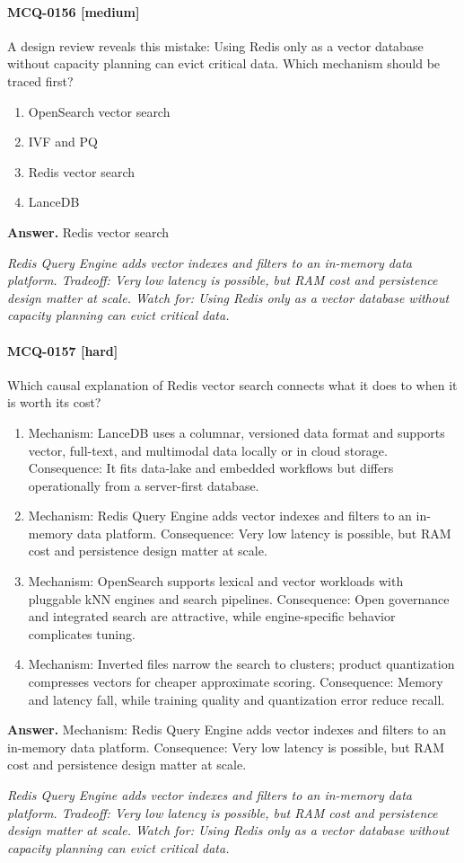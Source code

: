 \paragraph{MCQ-0156 [medium]} A design review reveals this mistake: Using Redis only as a vector database without capacity planning can evict critical data. Which mechanism should be traced first?
\begin{enumerate}[label=\Alph*.]
\item OpenSearch vector search
\item IVF and PQ
\item Redis vector search
\item LanceDB
\end{enumerate}
\noindent\textbf{Answer.} Redis vector search
\par\textit{Redis Query Engine adds vector indexes and filters to an in-memory data platform. Tradeoff: Very low latency is possible, but RAM cost and persistence design matter at scale. Watch for: Using Redis only as a vector database without capacity planning can evict critical data.}
\paragraph{MCQ-0157 [hard]} Which causal explanation of Redis vector search connects what it does to when it is worth its cost?
\begin{enumerate}[label=\Alph*.]
\item Mechanism: LanceDB uses a columnar, versioned data format and supports vector, full-text, and multimodal data locally or in cloud storage. Consequence: It fits data-lake and embedded workflows but differs operationally from a server-first database.
\item Mechanism: Redis Query Engine adds vector indexes and filters to an in-memory data platform. Consequence: Very low latency is possible, but RAM cost and persistence design matter at scale.
\item Mechanism: OpenSearch supports lexical and vector workloads with pluggable kNN engines and search pipelines. Consequence: Open governance and integrated search are attractive, while engine-specific behavior complicates tuning.
\item Mechanism: Inverted files narrow the search to clusters; product quantization compresses vectors for cheaper approximate scoring. Consequence: Memory and latency fall, while training quality and quantization error reduce recall.
\end{enumerate}
\noindent\textbf{Answer.} Mechanism: Redis Query Engine adds vector indexes and filters to an in-memory data platform. Consequence: Very low latency is possible, but RAM cost and persistence design matter at scale.
\par\textit{Redis Query Engine adds vector indexes and filters to an in-memory data platform. Tradeoff: Very low latency is possible, but RAM cost and persistence design matter at scale. Watch for: Using Redis only as a vector database without capacity planning can evict critical data.}
